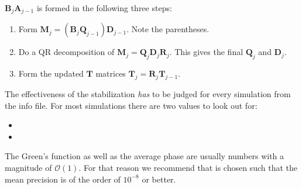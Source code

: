 $\mathcal{\bm{B}}_j \bm{A}_{j-1}$ is formed in the following three steps:
\begin{enumerate}
\item Form $ \bm{M}_j = (\mathcal{\bm{B}}_j \bm{Q}_{j-1}) \bm{D}_{j-1}$. Note the parentheses.
\item Do a QR decomposition of $\bm{M}_j = \bm{Q}_j \bm{D}_j \bm{R}_j$. This gives the final $\bm{Q}_j$ and $\bm{D}_j$.
\item Form the updated $\bm{T}$ matrices $\bm{T}_j = \bm{R}_j \bm{T}_{j-1}$.
\end{enumerate}
The effectiveness of the stabilization \emph{has} to be judged for every simulation from the info
file. For most simulations there are two values to look out for:
\begin{itemize}
\item {}
\item {}
\end{itemize}
The Green's function as well as the average phase are usually numbers with a magnitude of $\mathcal{O} (1)$. 
For that reason we recommend that  is chosen such that the mean precision is of the order of $10^{-8}$ or better.  
